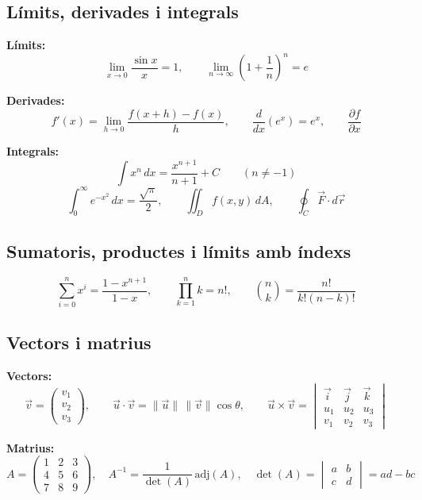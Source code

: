 \documentclass[informe, catalan]{practicaitic}
\theoremstyle{definition}
\theoremstyle{remark}
\begin{document}
\subsection{Límits, derivades i integrals}

\textbf{Límits:}
\[
\lim_{x \to 0} \frac{\sin x}{x} = 1, \qquad
\lim_{n \to \infty} \left(1 + \frac{1}{n}\right)^n = e
\]

\textbf{Derivades:}
\[
f'(x) = \lim_{h \to 0} \frac{f(x+h) - f(x)}{h}, \qquad
\frac{d}{dx}\left(e^x\right) = e^x, \qquad
\frac{\partial f}{\partial x}
\]

\textbf{Integrals:}
\[
\int x^n\, dx = \frac{x^{n+1}}{n+1} + C \qquad (n \neq -1)
\]
\[
\int_{0}^{\infty} e^{-x^2}\, dx = \frac{\sqrt{\pi}}{2}, \qquad
\iint_D f(x,y)\, dA, \qquad
\oint_C \vec{F}\cdot d\vec{r}
\]

\subsection{Sumatoris, productes i límits amb índexs}

\[
\sum_{i=0}^{n} x^i = \frac{1-x^{n+1}}{1-x}, \qquad
\prod_{k=1}^{n} k = n!, \qquad
\binom{n}{k} = \frac{n!}{k!(n-k)!}
\]

\subsection{Vectors i matrius}

\textbf{Vectors:}
\[
\vec{v} = \begin{pmatrix} v_1 \\ v_2 \\ v_3 \end{pmatrix}, \qquad
\vec{u} \cdot \vec{v} = \|\vec{u}\|\,\|\vec{v}\|\cos\theta, \qquad
\vec{u} \times \vec{v} = \begin{vmatrix} \vec{i} & \vec{j} & \vec{k} \\
u_1 & u_2 & u_3 \\ v_1 & v_2 & v_3 \end{vmatrix}
\]

\textbf{Matrius:}
\[
A = \begin{pmatrix} 1 & 2 & 3 \\ 4 & 5 & 6 \\ 7 & 8 & 9 \end{pmatrix}, \quad
A^{-1} = \frac{1}{\det(A)}\,\text{adj}(A), \quad
\det(A) = \begin{vmatrix} a & b \\ c & d \end{vmatrix} = ad - bc
\]
\end{document}

